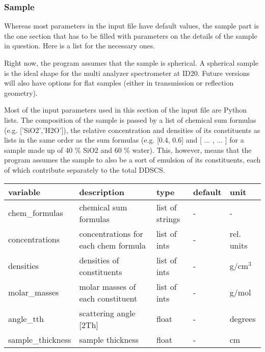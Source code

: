 \documentclass[aps,prl,groupedaddress]{revtex4}
\begin{document}
\subsubsection{Sample}
Whereas most parameters in the input file have default values, the sample part is the one section that has to be filled with parameters on the details of the sample in question. Here is a list for the necessary ones.

Right now, the program assumes that the sample is spherical. A spherical sample is the ideal shape for the multi analyzer spectrometer at ID20. Future versions will also have options for flat samples (either in transmission or reflection geometry).

Most of the input parameters used in this section of the input file are Python lists. The composition of the sample is passed by a list of chemical sum formulas (e.g. ['SiO2','H2O']), the relative concentration and densities of its constituents as lists in the same order as the sum formulas (e.g. [0.4, 0.6] and [ ... , ... ] for a sample made up of 40 \% SiO2 and 60 \% water). This, however, means that the program assumes the sample to also be a sort of emulsion of its constituents, each of which contribute separately to the total DDSCS.

\begin{ruledtabular}
\begin{tabular}{lllll}
variable            & description                          & type            & default  & unit       \\
\hline
chem\_formulas      & chemical sum formulas                & list of strings & -        & -          \\
concentrations      & concentrations for each chem formula & list of ints    & -        & rel. units \\
densities           & densities of constituents            & list of ints    & -        & g/cm$^3$   \\
molar\_masses       & molar masses of each constituent     & list of ints    & -        & g/mol      \\
angle\_tth          & scattering angle [2Th]               & float           & -        & degrees    \\
sample\_thickness   & sample thickness                     & float           & -        & cm         \\
\end{tabular}
\end{ruledtabular}
\end{document}
